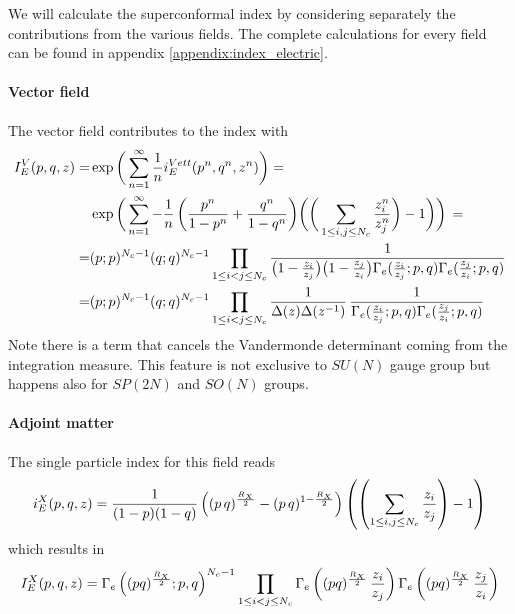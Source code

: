 We will calculate the superconformal index by considering separately the contributions from the various fields.
The complete calculations for every field can be found in appendix \ref{appendix:index_electric}.\\
\paragraph{Vector field}
The vector field contributes to the index with
\begin{equation}
\begin{aligned} 
I_E^V(p,q,z) = &\exp \bigg( \sum_{n=1}^{\infty} {1 \over n} i_E^{Vett} (p^n,q^n,z^n) \bigg) = \\
 &\exp \bigg( \sum_{n=1}^{\infty} - {1 \over n} \, \bigg( {p^n \over 1-p^n} + {q^n \over 1-q^n} \bigg)  \bigg(\bigg( \sum_{ 1 \leq i,j \leq N_c}  {z_i^n \over z_j^n}  \bigg)- 1 \bigg) \bigg) \, = \\
 = & (p;p)^{N_c-1} ( q;q)^{N_c-1}  \prod_{ 1 \leq i < j \leq N_c} \frac{ 1 }{ \big( 1 -{ z_i \over z_j} \big) \big ( 1 - { z_j \over z_i} \big) \Gamma_e( {z_i \over z_j};p,q) \Gamma_e({z_j \over z_i}; p,q)  } \\
 =& (p;p)^{N_c-1} ( q;q)^{N_c-1}  \prod_{ 1 \leq i < j \leq N_c}  \frac{1}{ \Delta(z) \Delta (z^{-1})} \,  \frac{ 1 }{ \Gamma_e( {z_i \over z_j};p,q) \Gamma_e({z_j \over z_i}; p,q)}
 \end{aligned}
 \label{eqn:sci_electric_vector}
 \end{equation}
 Note there is a term that cancels the Vandermonde determinant coming from the integration measure. This feature is not exclusive to $SU(N)$ gauge group but happens also for $SP(2N) $ and $SO(N)$ groups.\\
\paragraph{Adjoint matter}
The single particle index for this field reads
\begin{equation}
	i_E^{X}(p,q,z) = {1 \over (1-p)(1-q)}
	\left((p\,q)^{\frac{R_X}{2}}- (p\,q)^{1-\frac{R_X}{2}}\right) \left( \left(  \sum_{ 1 \leq i,j \leq N_c}  {z_i\over z_j}  \right)- 1 \right)
\end{equation}
which results in
\begin{equation}
 I_E^X (p,q,z) = \Gamma_e \left ( (pq)^\frac{R_X}{2};p,q \right)^{N_c-1} \displaystyle \prod_{1\leq i<j\leq N_c} \Gamma_e \left( (pq)^\frac{R_X}{2} \,  {z_i \over z_j} \right) \Gamma_e \left( (pq)^\frac{R_X}{2} \,  {z_j \over z_i}\right)
\end{equation}

